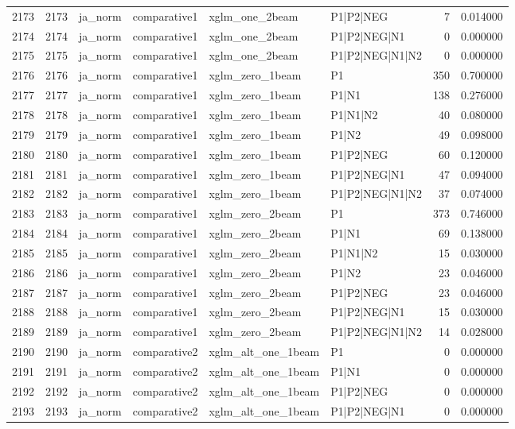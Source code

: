 \begin{tabular}{lrllllrr}
2173 & 2173 & ja_norm & comparative1 & xglm_one_2beam & P1|P2|NEG & 7 & 0.014000 \\
2174 & 2174 & ja_norm & comparative1 & xglm_one_2beam & P1|P2|NEG|N1 & 0 & 0.000000 \\
2175 & 2175 & ja_norm & comparative1 & xglm_one_2beam & P1|P2|NEG|N1|N2 & 0 & 0.000000 \\
2176 & 2176 & ja_norm & comparative1 & xglm_zero_1beam & P1 & 350 & 0.700000 \\
2177 & 2177 & ja_norm & comparative1 & xglm_zero_1beam & P1|N1 & 138 & 0.276000 \\
2178 & 2178 & ja_norm & comparative1 & xglm_zero_1beam & P1|N1|N2 & 40 & 0.080000 \\
2179 & 2179 & ja_norm & comparative1 & xglm_zero_1beam & P1|N2 & 49 & 0.098000 \\
2180 & 2180 & ja_norm & comparative1 & xglm_zero_1beam & P1|P2|NEG & 60 & 0.120000 \\
2181 & 2181 & ja_norm & comparative1 & xglm_zero_1beam & P1|P2|NEG|N1 & 47 & 0.094000 \\
2182 & 2182 & ja_norm & comparative1 & xglm_zero_1beam & P1|P2|NEG|N1|N2 & 37 & 0.074000 \\
2183 & 2183 & ja_norm & comparative1 & xglm_zero_2beam & P1 & 373 & 0.746000 \\
2184 & 2184 & ja_norm & comparative1 & xglm_zero_2beam & P1|N1 & 69 & 0.138000 \\
2185 & 2185 & ja_norm & comparative1 & xglm_zero_2beam & P1|N1|N2 & 15 & 0.030000 \\
2186 & 2186 & ja_norm & comparative1 & xglm_zero_2beam & P1|N2 & 23 & 0.046000 \\
2187 & 2187 & ja_norm & comparative1 & xglm_zero_2beam & P1|P2|NEG & 23 & 0.046000 \\
2188 & 2188 & ja_norm & comparative1 & xglm_zero_2beam & P1|P2|NEG|N1 & 15 & 0.030000 \\
2189 & 2189 & ja_norm & comparative1 & xglm_zero_2beam & P1|P2|NEG|N1|N2 & 14 & 0.028000 \\
2190 & 2190 & ja_norm & comparative2 & xglm_alt_one_1beam & P1 & 0 & 0.000000 \\
2191 & 2191 & ja_norm & comparative2 & xglm_alt_one_1beam & P1|N1 & 0 & 0.000000 \\
2192 & 2192 & ja_norm & comparative2 & xglm_alt_one_1beam & P1|P2|NEG & 0 & 0.000000 \\
2193 & 2193 & ja_norm & comparative2 & xglm_alt_one_1beam & P1|P2|NEG|N1 & 0 & 0.000000 \\

\end{tabular}
